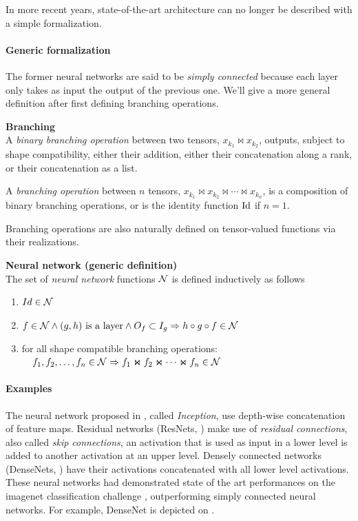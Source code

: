 In more recent years, state-of-the-art architecture can no longer be described with a simple formalization.

\paragraph{Generic formalization}

The former neural networks are said to be \emph{simply connected} because each layer only takes as input the output of the previous one. We'll give a more general definition after first defining branching operations.

\begin{definition}\textbf{Branching}\\
A \emph{binary branching operation} between two tensors, $x_{k_1} \Join x_{k_2}$, outputs, subject to shape compatibility, either their addition, either their concatenation along a rank, or their concatenation as a list.

A \emph{branching operation} between $n$ tensors, $x_{k_1} \Join x_{k_2} \Join \cdots \Join x_{k_n}$, is a composition of binary branching operations, or is the identity function $\operatorname{Id}$ if $n = 1$.

Branching operations are also naturally defined on tensor-valued functions via their realizations.
\end{definition}

\begin{definition}\textbf{Neural network (generic definition)}\\
The set of \emph{neural network} functions $\mathcal{N}$ is defined inductively as follows
\begin{enumerate}
  \item $Id \in \mathcal{N}$
  \item $f \in \mathcal{N} \wedge (g,h) \text{ is a layer} \wedge O_f \subset I_g \Rightarrow h \circ g \circ f \in \mathcal{N}$
  \item for all shape compatible branching operations:\\
  $\quad f_1, f_2, \ldots, f_n \in \mathcal{N} \Rightarrow  f_1 \Join f_2 \Join \cdots \Join f_n \in \mathcal{N}$
\end{enumerate}
\label{def:nn2}
\end{definition}

\paragraph{Examples}
The neural network proposed in \citep{szegedy2015going}, called \emph{Inception}, use depth-wise concatenation of feature maps. Residual networks (ResNets, \cite{he2016deep}) make use of \emph{residual connections}, also called \emph{skip connections}, \ie an activation that is used as input in a lower level is added to another activation at an upper level. Densely connected networks (DenseNets, \cite{huang2017densely}) have their activations concatenated with all lower level activations. These neural networks had demonstrated state of the art performances on the imagenet classification challenge \citep{deng2009imagenet}, outperforming simply connected neural networks. For example, DenseNet is depicted on .
\label{par:branching_ex}

